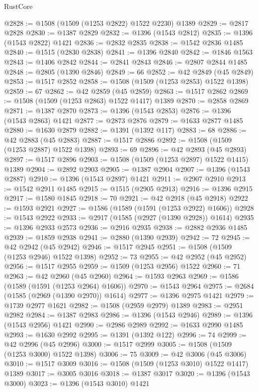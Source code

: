\begin{lexlean}{RustCore}
\begin{coremodule}
@2828 := @1508 (@1509 (@1253 @2822) @1522 @2230) @1389
@2829 := @2817 @2828
@2830 := @1387 @2829
@2832 := @1396 (@1543 @2812)
@2835 := @1396 (@1543 @2822) @1421
@2836 := @2832 @2835
@2838 := @1542 @2836 @1485
@2840 := @1515 (@2830 @2838)
@2841 := @1396 @2840
@2842 := @1846 @1563
@2843 := @1406 @2842
@2844 := @2841 @2843
@2846 := @2807 @2844 @1485
@2848 := @2805 (@1390 @2846)
@2849 := 66
@2852 := @42 @2849 (@45 @2849)
@2853 := @1517 @2852
@2858 := @1508 (@1509 (@1253 @2853) @1522 @1398)
@2859 := 67
@2862 := @42 @2859 (@45 @2859)
@2863 := @1517 @2862
@2869 := @1508 (@1509 (@1253 @2863) @1522 @1417) @1389
@2870 := @2858 @2869
@2871 := @1387 @2870
@2873 := @1396 (@1543 @2853)
@2876 := @1396 (@1543 @2863) @1421
@2877 := @2873 @2876
@2879 := @1633 @2877 @1485
@2880 := @1630 @2879
@2882 := @1391 (@1392 @117)
@2883 := 68
@2886 := @42 @2883 (@45 @2883)
@2887 := @1517 @2886
@2892 := @1508 (@1509 (@1253 @2887) @1522 @1398)
@2893 := 69
@2896 := @42 @2893 (@45 @2893)
@2897 := @1517 @2896
@2903 := @1508 (@1509 (@1253 @2897) @1522 @1415) @1389
@2904 := @2892 @2903
@2905 := @1387 @2904
@2907 := @1396 (@1543 @2887)
@2910 := @1396 (@1543 @2897) @1421
@2911 := @2907 @2910
@2913 := @1542 @2911 @1485
@2915 := @1515 (@2905 @2913)
@2916 := @1396 @2915
@2917 := @1580 @1845
@2918 := 70
@2921 := @42 @2918 (@45 @2918)
@2922 := @1593 @2921
@2927 := @1586 (@1589 (@1591 (@1253 @2922) @1606))
@2928 := @1543 @2922
@2933 := @2917 (@1585 (@2927 (@1390 @2928)) @1614)
@2935 := @1396 @2933 @2573
@2936 := @2916 @2935
@2938 := @2882 @2936 @1485
@2939 := @1859 @2938
@2941 := @2880 (@1390 @2939)
@2942 := 72
@2945 := @42 @2942 (@45 @2942)
@2946 := @1517 @2945
@2951 := @1508 (@1509 (@1253 @2946) @1522 @1398)
@2952 := 73
@2955 := @42 @2952 (@45 @2952)
@2956 := @1517 @2955
@2959 := @1509 (@1253 @2956) @1522
@2960 := 71
@2963 := @42 @2960 (@45 @2960)
@2964 := @1593 @2963
@2969 := @1586 (@1589 (@1591 (@1253 @2964) @1606))
@2970 := @1543 @2964
@2975 := @2684 (@1585 (@2969 (@1390 @2970)) @1614)
@2977 := @1396 @2975 @1421
@2979 := @1739 @2977 @1621
@2982 := @1508 (@2959 @2979) @1389
@2983 := @2951 @2982
@2984 := @1387 @2983
@2986 := @1396 (@1543 @2946)
@2989 := @1396 (@1543 @2956) @1421
@2990 := @2986 @2989
@2992 := @1633 @2990 @1485
@2993 := @1630 @2992
@2995 := @1391 (@1392 @122)
@2996 := 74
@2999 := @42 @2996 (@45 @2996)
@3000 := @1517 @2999
@3005 := @1508 (@1509 (@1253 @3000) @1522 @1398)
@3006 := 75
@3009 := @42 @3006 (@45 @3006)
@3010 := @1517 @3009
@3016 := @1508 (@1509 (@1253 @3010) @1522 @1417) @1389
@3017 := @3005 @3016
@3018 := @1387 @3017
@3020 := @1396 (@1543 @3000)
@3023 := @1396 (@1543 @3010) @1421

\end{coremodule}
\end{lexlean}
